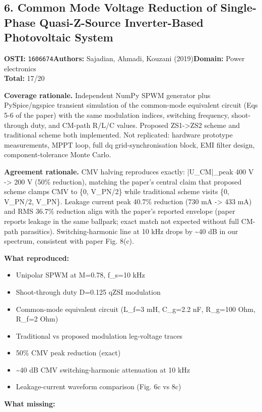 \subsection{6. Common Mode Voltage Reduction of Single-Phase Quasi-Z-Source Inverter-Based Photovoltaic System}
\textbf{OSTI:} \texttt{1606674}\quad\textbf{Authors:} Sajadian, Ahmadi, Kouzani (2019)\quad\textbf{Domain:} Power electronics\\
\quad{}\quad\textbf{Total:} 17/20\par\smallskip
\noindent\textbf{Coverage rationale.} Independent NumPy SPWM generator plus PySpice/ngspice transient simulation of the common-mode equivalent circuit (Eqs 5-6 of the paper) with the same modulation indices, switching frequency, shoot-through duty, and CM-path R/L/C values. Proposed ZS1-\textgreater{}ZS2 scheme and traditional scheme both implemented. Not replicated: hardware prototype measurements, MPPT loop, full dq grid-synchronisation block, EMI filter design, component-tolerance Monte Carlo.\par
\noindent\textbf{Agreement rationale.} CMV halving reproduces exactly: |U\_CM|\_peak 400 V -\textgreater{} 200 V (50\% reduction), matching the paper's central claim that proposed scheme clamps CMV to \{0, V\_PN/2\} while traditional scheme visits \{0, V\_PN/2, V\_PN\}. Leakage current peak 40.7\% reduction (730 mA -\textgreater{} 433 mA) and RMS 36.7\% reduction align with the paper's reported envelope (paper reports leakage in the same ballpark; exact match not expected without full CM-path parasitics). Switching-harmonic line at 10 kHz drops by \textasciitilde{}40 dB in our spectrum, consistent with paper Fig. 8(c).\par\smallskip
\noindent\textbf{What reproduced:}
\begin{itemize}[leftmargin=1.4em,itemsep=0.2em,topsep=0.2em]
\item Unipolar SPWM at M=0.78, f\_s=10 kHz
\item Shoot-through duty D=0.125 qZSI modulation
\item Common-mode equivalent circuit (L\_f=3 mH, C\_g=2.2 nF, R\_g=100 Ohm, R\_f=2 Ohm)
\item Traditional vs proposed modulation leg-voltage traces
\item 50\% CMV peak reduction (exact)
\item \textasciitilde{}40 dB CMV switching-harmonic attenuation at 10 kHz
\item Leakage-current waveform comparison (Fig. 6c vs 8c)
\end{itemize}\noindent\textbf{What missing:}

